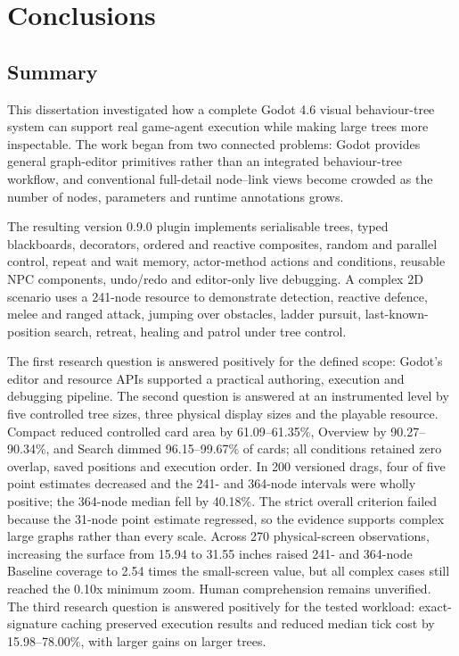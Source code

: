 \chapter{Conclusions}
\label{ch:conclusion}

\section{Summary}

This dissertation investigated how a complete Godot 4.6 visual behaviour-tree system can support real game-agent execution while making large trees more inspectable. The work began from two connected problems: Godot provides general graph-editor primitives rather than an integrated behaviour-tree workflow, and conventional full-detail node--link views become crowded as the number of nodes, parameters and runtime annotations grows.

The resulting version 0.9.0 plugin implements serialisable trees, typed blackboards, decorators, ordered and reactive composites, random and parallel control, repeat and wait memory, actor-method actions and conditions, reusable NPC components, undo/redo and editor-only live debugging. A complex 2D scenario uses a 241-node resource to demonstrate detection, reactive defence, melee and ranged attack, jumping over obstacles, ladder pursuit, last-known-position search, retreat, healing and patrol under tree control.

The first research question is answered positively for the defined scope: Godot's editor and resource APIs supported a practical authoring, execution and debugging pipeline. The second question is answered at an instrumented level by five controlled tree sizes, three physical display sizes and the playable resource. Compact reduced controlled card area by 61.09--61.35\%, Overview by 90.27--90.34\%, and Search dimmed 96.15--99.67\% of cards; all conditions retained zero overlap, saved positions and execution order. In 200 versioned drags, four of five point estimates decreased and the 241- and 364-node intervals were wholly positive; the 364-node median fell by 40.18\%. The strict overall criterion failed because the 31-node point estimate regressed, so the evidence supports complex large graphs rather than every scale. Across 270 physical-screen observations, increasing the surface from 15.94 to 31.55 inches raised 241- and 364-node Baseline coverage to 2.54 times the small-screen value, but all complex cases still reached the 0.10x minimum zoom. Human comprehension remains unverified. The third research question is answered positively for the tested workload: exact-signature caching preserved execution results and reduced median tick cost by 15.98--78.00\%, with larger gains on larger trees.

